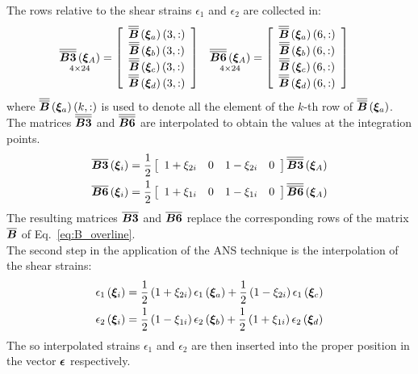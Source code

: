 The rows relative to the shear strains $\epsilon_1$ and $\epsilon_2$ are collected in:
\begin{align}
\underset{ 4 \times 24 }{\overline{\overline{\TT{B3}}} \valxiA} & =
\sqbr{ \matr{ c c  }{
\overline{\overline{\TT{B}}} \plbr{ \T{\xi}_a } \plbr{3,:} \\
\overline{\overline{\TT{B}}} \plbr{ \T{\xi}_b } \plbr{3,:} \\
\overline{\overline{\TT{B}}} \plbr{ \T{\xi}_c } \plbr{3,:} \\
\overline{\overline{\TT{B}}} \plbr{ \T{\xi}_d } \plbr{3,:}
}}
&
\underset{ 4 \times 24 }{\overline{\overline{\TT{B6}}} \valxiA} & =
\sqbr{ \matr{ c c  }{
\overline{\overline{\TT{B}}} \plbr{ \T{\xi}_a } \plbr{6,:} \\
\overline{\overline{\TT{B}}} \plbr{ \T{\xi}_b } \plbr{6,:} \\
\overline{\overline{\TT{B}}} \plbr{ \T{\xi}_c } \plbr{6,:} \\
\overline{\overline{\TT{B}}} \plbr{ \T{\xi}_d } \plbr{6,:}
}}
\end{align}
where $\overline{\overline{\TT{B}}} \plbr{ \T{\xi}_a } \plbr{k,:}$ is used to denote all the element of the $k$-th row of $\overline{\overline{\TT{B}}} \plbr{ \T{\xi}_a }$.\\
The matrices $\overline{\overline{\TT{B3}}}$ and $\overline{\overline{\TT{B6}}}$ are interpolated to obtain the values at the integration points.
\begin{align}
\overline{\TT{B3}} \valxii & = \fracd{1}{2}
\sqbr{ \matr{ c c c c  }{
1 + \xi_{2i} & 0 & 1 - \xi_{2i} & 0
}}
\overline{\overline{\TT{B3}}} \valxiA
\\
\overline{\TT{B6}} \valxii & = \fracd{1}{2}
\sqbr{ \matr{ c c c c  }{
1 + \xi_{1i} & 0 & 1 - \xi_{1i} & 0
}}
\overline{\overline{\TT{B6}}} \valxiA
\end{align}
The resulting matrices $\overline{\TT{B3}}$ and $\overline{\TT{B6}}$ replace the corresponding rows of the matrix $\overline{\TT{B}}$ of Eq.~\ref{eq:B_overline}.\\
The second step in the application of the ANS technique is the interpolation of the shear strains:
\begin{subequations}
\begin{align}
\epsilon_1 \valxii & =
\fracd{1}{2} \plbr{ 1 + \xi_{2i} } \epsilon_1 \plbr{ \T{\xi}_a } + \fracd{1}{2} \plbr{1-\xi_{2i}} \epsilon_1 \plbr{ \T{\xi}_c } \\
\epsilon_2 \valxii & =
\fracd{1}{2} \plbr{ 1 - \xi_{1i} } \epsilon_2 \plbr{ \T{\xi}_b } + \fracd{1}{2} \plbr{1+\xi_{1i}} \epsilon_2 \plbr{ \T{\xi}_d }
\end{align}
\end{subequations}
The so interpolated strains $\epsilon_1$ and $\epsilon_2$ are then inserted into the proper position in the vector $\T{\epsilon}$ respectively.\\
